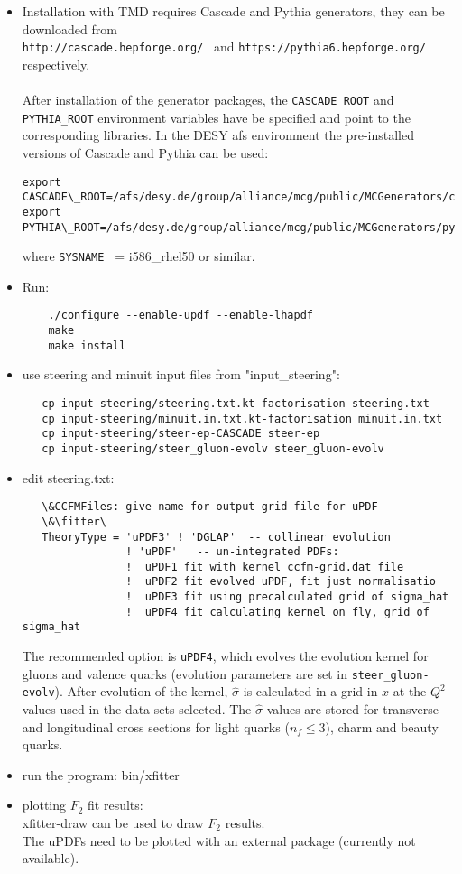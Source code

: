 \begin{itemize}

\item Installation with TMD requires Cascade and Pythia generators, 
they can be downloaded from\\
{\tt http://cascade.hepforge.org/ } and 
{\tt https://pythia6.hepforge.org/ } respectively. \\
        \\
After installation of the generator packages, the {\tt CASCADE\_ROOT}  and {\tt PYTHIA\_ROOT} 
environment variables have be specified and point to the corresponding libraries. 
In the DESY afs environment the pre-installed versions of Cascade and Pythia can be used:  
%
{\footnotesize\begin{verbatim}
export CASCADE\_ROOT=/afs/desy.de/group/alliance/mcg/public/MCGenerators/cascade/2.2.04/\$SYSNAME 
export PYTHIA\_ROOT=/afs/desy.de/group/alliance/mcg/public/MCGenerators/pythia6/425/\$SYSNAME}
\end{verbatim} }
\normalsize
where {\tt SYSNAME } = i586\_rhel50 or similar.

\item Run:
\begin{verbatim}
    ./configure --enable-updf --enable-lhapdf
    make 
    make install
\end{verbatim}


\item use steering and minuit input files from "input\_steering": 

   \begin{verbatim} 
   cp input-steering/steering.txt.kt-factorisation steering.txt 
   cp input-steering/minuit.in.txt.kt-factorisation minuit.in.txt 
   cp input-steering/steer-ep-CASCADE steer-ep 
   cp input-steering/steer_gluon-evolv steer_gluon-evolv
    \end{verbatim}

\item  edit steering.txt: 
   \begin{verbatim}
   \&CCFMFiles: give name for output grid file for uPDF   
   \&\fitter\ 
   TheoryType = 'uPDF3' ! 'DGLAP'  -- collinear evolution
                ! 'uPDF'   -- un-integrated PDFs:
                !  uPDF1 fit with kernel ccfm-grid.dat file
                !  uPDF2 fit evolved uPDF, fit just normalisatio
                !  uPDF3 fit using precalculated grid of sigma_hat
                !  uPDF4 fit calculating kernel on fly, grid of sigma_hat
  \end{verbatim}
  The recommended option is \verb+uPDF4+, which evolves the evolution kernel for gluons and valence quarks
  (evolution parameters are set in \verb+steer_gluon-evolv+). After evolution of the kernel, $\hat {\sigma}$ is
  calculated in a grid in $x$ at the  $Q^2$ values used in the data sets selected. The ${\hat \sigma}$ values are   
  stored for transverse and longitudinal cross sections for light quarks ($n_f \leq 3$), charm and beauty quarks.
\item run the program: bin/xfitter 
   
\item plotting $F_2$ fit results: \\
xfitter-draw  can be used to draw $F_2$ results. \\
The uPDFs need to be plotted with an external package (currently not available).
\end{itemize}

